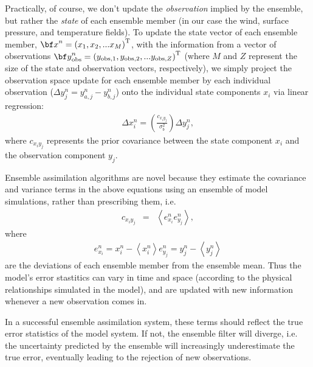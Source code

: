 Practically, of course, we don't update the \textit{observation} implied by the ensemble, but rather the \textit{state} of each ensemble member (in our case the wind, surface pressure, and temperature fields). 
To update the state vector of each ensemble member, ${\bf x}^n = \left(x_1,x_2,...x_M  \right)^{\text{T}}$, with the information from a vector of observations ${\bf y}_{\text{obs}}^n = \left(y_{\text{obs},1},y_{\text{obs},2},...y_{\text{obs},Z}  \right)^{\text{T}}$ (where $M$ and $Z$ represent the size of the state and observation vectors, respectively), we simply project the observation space update for each ensemble member by each individual observation ($\Delta y^n_j = y_{a,j}^n-y_{b,j}^n$) onto the individual state components $x_i$ via linear regression:
\begin{eqnarray}
 \Delta x_{i}^n = 
\left(
\frac{c_{x_iy_j}}{\sigma_b^2}
\right)
\Delta y^n_j,
\label{eq:state_update}
\end{eqnarray}
where $c_{x_iy_j}$ represents the prior covariance between the state component $x_i$ and the observation component $y_j$.


Ensemble assimilation algorithms are novel because they estimate the covariance and variance terms in the above equations using an ensemble of model simulations, rather than prescribing them, i.e. 
\begin{eqnarray}
c_{x_iy_j} &=& 
\left<
e_{x_i}^n 
e_{y_j}^n
\right>,
\label{eq:covariance} 
\end{eqnarray}
%
%
%
where 
\begin{eqnarray}
	e_{x_i}^n = x_i^n - \left< x_i^n \right>   \label{eq:exn}
	e_{y_j}^n = y_j^n - \left< y_j^n \right>    \label{eq:eyn}
\end{eqnarray}
are the deviations of each ensemble member from the ensemble mean.
Thus the model's error stastitics can vary in time and space (according to the physical relationships simulated in the model), and are updated with new information whenever a new observation comes in.  

In a successful ensemble assimilation system, these terms should reflect the true error statistics of the model system.
If not, the ensemble filter will diverge, i.e. the uncertainty predicted by the ensemble will increasingly underestimate the true error, eventually leading to the rejection of new observations.


